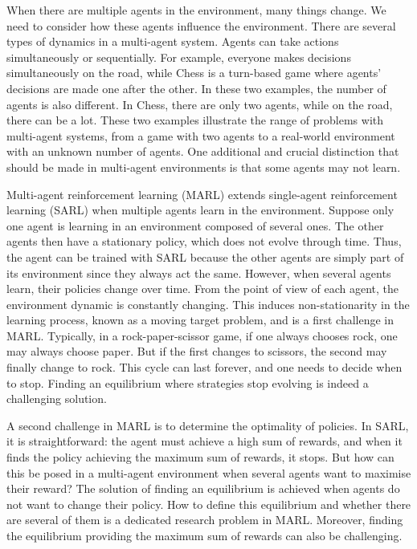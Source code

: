When there are multiple agents in the environment, many things change.
We need to consider how these agents influence the environment.
There are several types of dynamics in a multi-agent system.
Agents can take actions simultaneously or sequentially.
For example, everyone makes decisions simultaneously on the road, while Chess is a turn-based game where agents' decisions are made one after the other.
In these two examples, the number of agents is also different.
In Chess, there are only two agents, while on the road, there can be a lot.
These two examples illustrate the range of problems with multi-agent systems, from a game with two agents to a real-world environment with an unknown number of agents.
One additional and crucial distinction that should be made in multi-agent environments is that some agents may not learn.

Multi-agent reinforcement learning (MARL) extends single-agent reinforcement learning (SARL) when multiple agents learn in the environment.
Suppose only one agent is learning in an environment composed of several ones.
The other agents then have a stationary policy, which does not evolve through time.
Thus, the agent can be trained with SARL because the other agents are simply part of its environment since they always act the same.
However, when several agents learn, their policies change over time.
From the point of view of each agent, the environment dynamic is constantly changing.
This induces non-stationarity in the learning process, known as a moving target problem, and is a first challenge in MARL.
Typically, in a rock-paper-scissor game, if one always chooses rock, one may always choose paper.
But if the first changes to scissors, the second may finally change to rock.
This cycle can last forever, and one needs to decide when to stop.
Finding an equilibrium where strategies stop evolving is indeed a challenging solution.

A second challenge in MARL is to determine the optimality of policies.
In SARL, it is straightforward: the agent must achieve a high sum of rewards, and when it finds the policy achieving the maximum sum of rewards, it stops.
But how can this be posed in a multi-agent environment when several agents want to maximise their reward?
The solution of finding an equilibrium is achieved when agents do not want to change their policy.
How to define this equilibrium and whether there are several of them is a dedicated research problem in MARL.
Moreover, finding the equilibrium providing the maximum sum of rewards can also be challenging.

